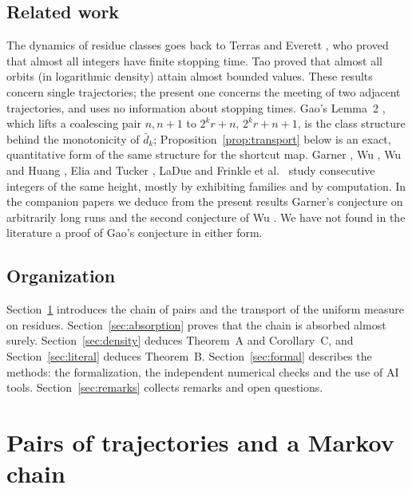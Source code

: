 \documentclass[11pt]{amsart}
\theoremstyle{definition}
\theoremstyle{remark}
\newcommand{\dbar}{\bar d}
\begin{document}
\subsection{Related work}
The dynamics of residue classes goes back to Terras \cite{Ter76} and Everett \cite{Eve77}, who proved that almost all integers have finite stopping time. Tao \cite{Tao22} proved that almost all orbits (in logarithmic density) attain almost bounded values. These results concern single trajectories; the present one concerns the meeting of two adjacent trajectories, and uses no information about stopping times. Gao's Lemma~2 \cite{Gao93}, which lifts a coalescing pair $n,n+1$ to $2^kr+n,\,2^kr+n+1$, is the class structure behind the monotonicity of $\dbar_k$; Proposition~\ref{prop:transport} below is an exact, quantitative form of the same structure for the shortcut map. Garner \cite{Gar85}, Wu \cite{Wu92,Wu93,Wu95}, Wu and Huang \cite{WH01}, Elia and Tucker \cite{ET15}, LaDue \cite{LaD17} and Frinkle et al.\ \cite{Fri25} study consecutive integers of the same height, mostly by exhibiting families and by computation. In the companion papers we deduce from the present results Garner's conjecture on arbitrarily long runs \cite{SaidGarner} and the second conjecture of Wu \cite{SaidWu}. We have not found in the literature a proof of Gao's conjecture in either form.

\subsection{Organization}
Section~\ref{sec:chain} introduces the chain of pairs and the transport of the uniform measure on residues. Section~\ref{sec:absorption} proves that the chain is absorbed almost surely. Section~\ref{sec:density} deduces Theorem~A and Corollary~C, and Section~\ref{sec:literal} deduces Theorem~B. Section~\ref{sec:formal} describes the methods: the formalization, the independent numerical checks and the use of AI tools. Section~\ref{sec:remarks} collects remarks and open questions.

\section{Pairs of trajectories and a Markov chain}\label{sec:chain}
\end{document}

